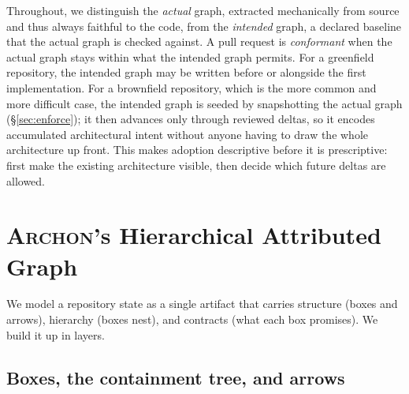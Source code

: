 \documentclass[sigconf,review,anonymous]{acmart}
\theoremstyle{plain}
\theoremstyle{definition}
\begin{document}
Throughout, we distinguish the \emph{actual} graph, extracted mechanically from
source and thus always faithful to the code, from the \emph{intended} graph, a
declared baseline that the actual graph is checked against. A pull request is
\emph{conformant} when the actual graph stays within what the intended graph
permits. For a greenfield repository, the intended graph may be written before
or alongside the first implementation. For a brownfield repository, which is the
more common and more difficult case, the intended graph is seeded by snapshotting
the actual graph (\S\ref{sec:enforce}); it then advances only through reviewed
deltas, so it encodes accumulated architectural intent without anyone having to
draw the whole architecture up front. This makes adoption descriptive before it
is prescriptive: first make the existing architecture visible, then decide which
future deltas are allowed.

\section{\textsc{Archon}'s Hierarchical Attributed Graph}\label{sec:model}

We model a repository state as a single artifact that carries structure
(boxes and arrows), hierarchy (boxes nest), and contracts (what each box
promises). We build it up in layers.

\subsection{Boxes, the containment tree, and arrows}
\end{document}
